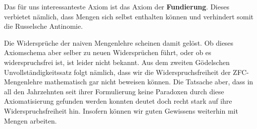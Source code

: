 \documentclass[../../main.tex]{subfiles}
\begin{document}
Das für uns interessanteste Axiom ist das Axiom der \textbf{Fundierung}. Dieses verbietet nämlich, dass Mengen sich selbst enthalten können und verhindert somit die Russelsche Antinomie. 

Die Widersprüche der naiven Mengenlehre scheinen damit gelöst. Ob dieses Axiomschema aber selber zu neuen Widersprüchen führt, oder ob es widerspruchsfrei ist, ist leider nicht bekannt. Aus dem zweiten Gödelschen Unvollständigkeitssatz folgt nämlich, dass wir die Widerspruchsfreiheit der ZFC-Mengenlehre mathematisch gar nicht beweisen können. Die Tatsache aber, dass in all den Jahrzehnten seit ihrer Formulierung keine Paradoxen durch diese Axiomatisierung gefunden werden konnten deutet doch recht stark auf ihre Widerspruchsfreiheit hin. Insofern können wir guten Gewissens weiterhin mit Mengen arbeiten.
\newpage
\pagecolor{white}
\end{document}
